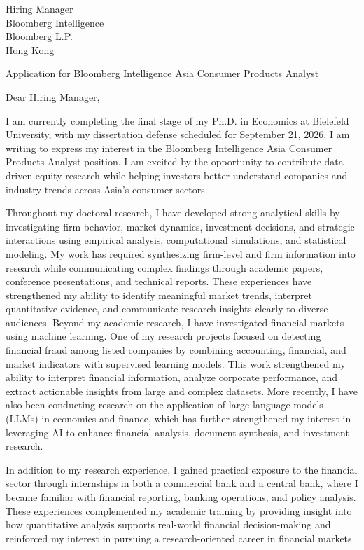 \documentclass[11pt]{article}
\begin{document}
\noindent
Hiring Manager \\
Bloomberg Intelligence \\
Bloomberg L.P. \\
Hong Kong \\

\vspace{0.1cm}

\noindent
Application for Bloomberg Intelligence Asia Consumer Products Analyst \\

\vspace{0.05cm}

\noindent Dear Hiring Manager,

I am currently completing the final stage of my Ph.D. in Economics at Bielefeld University, with my dissertation defense scheduled for September 21, 2026. I am writing to express my interest in the Bloomberg Intelligence Asia Consumer Products Analyst position. I am excited by the opportunity to contribute data-driven equity research while helping investors better understand companies and industry trends across Asia's consumer sectors.

Throughout my doctoral research, I have developed strong analytical skills by investigating firm behavior, market dynamics, investment decisions, and strategic interactions using empirical analysis, computational simulations, and statistical modeling. My work has required synthesizing firm-level and firm information into research while communicating complex findings through academic papers, conference presentations, and technical reports. These experiences have strengthened my ability to identify meaningful market trends, interpret quantitative evidence, and communicate research insights clearly to diverse audiences.
Beyond my academic research, I have investigated financial markets using machine learning. One of my research projects focused on detecting financial fraud among listed companies by combining accounting, financial, and market indicators with supervised learning models. This work strengthened my ability to interpret financial information, analyze corporate performance, and extract actionable insights from large and complex datasets. More recently, I have also been conducting research on the application of large language models (LLMs) in economics and finance, which has further strengthened my interest in leveraging AI to enhance financial analysis, document synthesis, and investment research.

In addition to my research experience, I gained practical exposure to the financial sector through internships in both a commercial bank and a central bank, where I became familiar with financial reporting, banking operations, and policy analysis. These experiences complemented my academic training by providing insight into how quantitative analysis supports real-world financial decision-making and reinforced my interest in pursuing a research-oriented career in financial markets.
\end{document}
